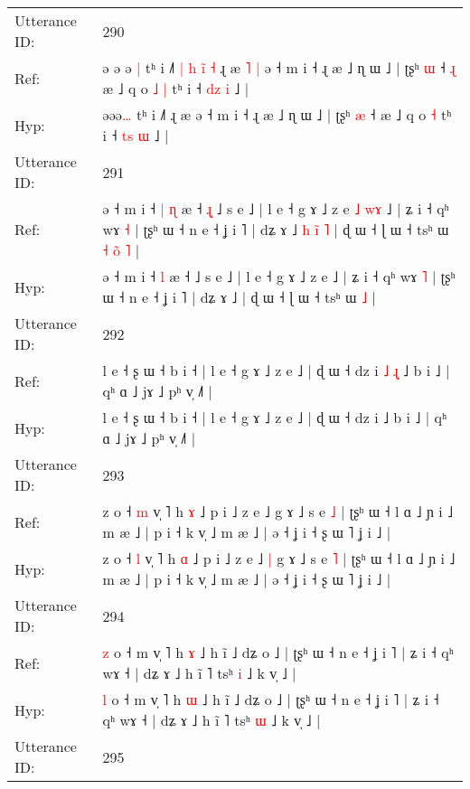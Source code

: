 \documentclass[10pt]{article}
\DeclareRobustCommand{\hl}[1]{{\textcolor{red}{#1}}}
\begin{document}
\begin{longtable}{ll}
\midrule
Utterance ID: & 290 \\
Ref: & ə\hl{ }ə\hl{ }ə\hl{ }\hl{|} tʰ i ˩˥\hl{ }\hl{|}\hl{ }\hl{h}\hl{ }\hl{i}\hl{̃}\hl{ }\hl{˧} ɻ æ\hl{ }\hl{˥}\hl{ }\hl{|} ə ˧ m i ˧ ɻ æ ˩ ɳ ɯ ˩ | ʈʂʰ \hl{ɯ} ˧\hl{ }\hl{ɻ} æ ˩ q o\hl{ }\hl{˩} \hl{|} tʰ i ˧ \hl{d}\hl{z} \hl{i} ˩ |
 \\
Hyp: & ə\hl{}ə\hl{}ə\hl{}\hl{…} tʰ i ˩˥\hl{}\hl{}\hl{}\hl{}\hl{}\hl{}\hl{}\hl{}\hl{} ɻ æ\hl{}\hl{}\hl{}\hl{} ə ˧ m i ˧ ɻ æ ˩ ɳ ɯ ˩ | ʈʂʰ \hl{æ} ˧\hl{}\hl{} æ ˩ q o\hl{}\hl{} \hl{˧} tʰ i ˧ \hl{t}\hl{s} \hl{ɯ} ˩ |
 \\
\midrule
Utterance ID: & 291 \\
Ref: & ə ˧ m i ˧\hl{ }\hl{|} \hl{ɳ} æ ˧\hl{ }\hl{ɻ}\hl{̩} ˩ s e ˩ | l e ˧ g ɤ ˩ z e\hl{ }\hl{˩}\hl{ }\hl{w}\hl{ɤ} ˩ | ʑ i ˧ qʰ wɤ \hl{˧} | ʈʂʰ ɯ ˧ n e ˧ ʝ i ˥ | dʑ ɤ ˩\hl{ }\hl{h}\hl{ }\hl{i}\hl{̃}\hl{ }\hl{˥} | ɖ ɯ ˧ ɭ ɯ ˧ tsʰ ɯ\hl{ }\hl{˧}\hl{ }\hl{o}\hl{̃} \hl{˥} |
 \\
Hyp: & ə ˧ m i ˧\hl{}\hl{} \hl{l} æ ˧\hl{}\hl{}\hl{} ˩ s e ˩ | l e ˧ g ɤ ˩ z e\hl{}\hl{}\hl{}\hl{}\hl{} ˩ | ʑ i ˧ qʰ wɤ \hl{˥} | ʈʂʰ ɯ ˧ n e ˧ ʝ i ˥ | dʑ ɤ ˩\hl{}\hl{}\hl{}\hl{}\hl{}\hl{}\hl{} | ɖ ɯ ˧ ɭ ɯ ˧ tsʰ ɯ\hl{}\hl{}\hl{}\hl{}\hl{} \hl{˩} |
 \\
\midrule
Utterance ID: & 292 \\
Ref: & l e ˧ ʂ ɯ ˧ b i ˧ | l e ˧ g ɤ ˩ z e ˩ | ɖ ɯ ˧ dz i\hl{ }\hl{˩}\hl{ }\hl{ɻ}\hl{̩} ˩ b i ˩ | qʰ ɑ ˩ jɤ ˩ pʰ v̩ ˩˥ |
 \\
Hyp: & l e ˧ ʂ ɯ ˧ b i ˧ | l e ˧ g ɤ ˩ z e ˩ | ɖ ɯ ˧ dz i\hl{}\hl{}\hl{}\hl{}\hl{} ˩ b i ˩ | qʰ ɑ ˩ jɤ ˩ pʰ v̩ ˩˥ |
 \\
\midrule
Utterance ID: & 293 \\
Ref: & z o ˧ \hl{m} v̩ ˥ h \hl{ɤ} ˩ p i ˩ z e ˩\hl{}\hl{} g ɤ ˩ s e \hl{˩} | ʈʂʰ ɯ ˧ l ɑ ˩ ɲ i ˩ m æ ˩ | p i ˧ k v̩ ˩ m æ ˩ | ə ˧ ʝ i ˧ ʂ ɯ ˥ ʝ i ˩ |
 \\
Hyp: & z o ˧ \hl{l} v̩ ˥ h \hl{ɑ} ˩ p i ˩ z e ˩\hl{ }\hl{|} g ɤ ˩ s e \hl{˥} | ʈʂʰ ɯ ˧ l ɑ ˩ ɲ i ˩ m æ ˩ | p i ˧ k v̩ ˩ m æ ˩ | ə ˧ ʝ i ˧ ʂ ɯ ˥ ʝ i ˩ |
 \\
\midrule
Utterance ID: & 294 \\
Ref: & \hl{z} o ˧ m v̩ ˥ h \hl{ɤ} ˩ h ĩ ˩ dʑ o ˩ | ʈʂʰ ɯ ˧ n e ˧ ʝ i ˥ | ʑ i ˧ qʰ wɤ ˧ | dʑ ɤ ˩ h ĩ ˥ tsʰ \hl{i} ˩ k v̩ ˩ |
 \\
Hyp: & \hl{l} o ˧ m v̩ ˥ h \hl{ɯ} ˩ h ĩ ˩ dʑ o ˩ | ʈʂʰ ɯ ˧ n e ˧ ʝ i ˥ | ʑ i ˧ qʰ wɤ ˧ | dʑ ɤ ˩ h ĩ ˥ tsʰ \hl{ɯ} ˩ k v̩ ˩ |
 \\
\midrule
Utterance ID: & 295 \\

\end{longtable}
\end{document}
